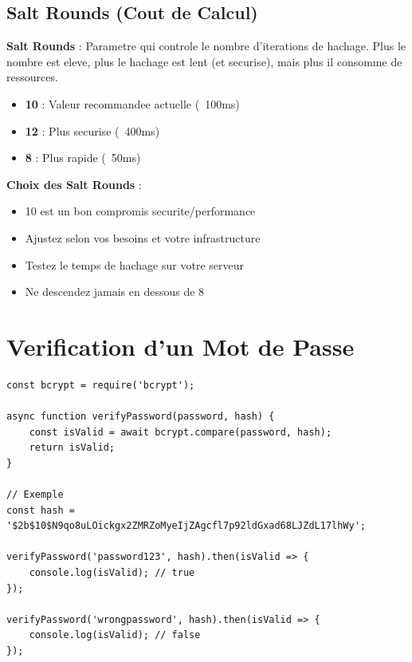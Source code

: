 \documentclass[a4paper,12pt]{book}
\begin{document}
\subsection{Salt Rounds (Cout de Calcul)}

\begin{definitionbox}
    \textbf{Salt Rounds} : Parametre qui controle le nombre d'iterations de hachage. Plus le nombre est eleve, plus le hachage est lent (et securise), mais plus il consomme de ressources.
\end{definitionbox}

\begin{itemize}
    \item \textbf{10} : Valeur recommandee actuelle (~100ms)
    \item \textbf{12} : Plus securise (~400ms)
    \item \textbf{8} : Plus rapide (~50ms)
\end{itemize}

\begin{bestpracticebox}
    \textbf{Choix des Salt Rounds} :
    \begin{itemize}
        \item 10 est un bon compromis securite/performance
        \item Ajustez selon vos besoins et votre infrastructure
        \item Testez le temps de hachage sur votre serveur
        \item Ne descendez jamais en dessous de 8
    \end{itemize}
\end{bestpracticebox}

\section{Verification d'un Mot de Passe}

\begin{lstlisting}[style=javascript, caption=Verification d'un mot de passe avec bcrypt]
const bcrypt = require('bcrypt');

async function verifyPassword(password, hash) {
    const isValid = await bcrypt.compare(password, hash);
    return isValid;
}

// Exemple
const hash = '$2b$10$N9qo8uLOickgx2ZMRZoMyeIjZAgcfl7p92ldGxad68LJZdL17lhWy';

verifyPassword('password123', hash).then(isValid => {
    console.log(isValid); // true
});

verifyPassword('wrongpassword', hash).then(isValid => {
    console.log(isValid); // false
});
\end{lstlisting}
\end{document}

